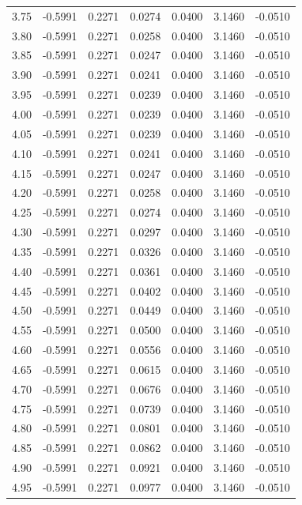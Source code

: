 \begin{longtable}{|c|c|c|c|c|c|c|}
3.75 & -0.5991 & 0.2271 & 0.0274 & 0.0400 & 3.1460 & -0.0510 \\
3.80 & -0.5991 & 0.2271 & 0.0258 & 0.0400 & 3.1460 & -0.0510 \\
3.85 & -0.5991 & 0.2271 & 0.0247 & 0.0400 & 3.1460 & -0.0510 \\
3.90 & -0.5991 & 0.2271 & 0.0241 & 0.0400 & 3.1460 & -0.0510 \\
3.95 & -0.5991 & 0.2271 & 0.0239 & 0.0400 & 3.1460 & -0.0510 \\
4.00 & -0.5991 & 0.2271 & 0.0239 & 0.0400 & 3.1460 & -0.0510 \\
4.05 & -0.5991 & 0.2271 & 0.0239 & 0.0400 & 3.1460 & -0.0510 \\
4.10 & -0.5991 & 0.2271 & 0.0241 & 0.0400 & 3.1460 & -0.0510 \\
4.15 & -0.5991 & 0.2271 & 0.0247 & 0.0400 & 3.1460 & -0.0510 \\
4.20 & -0.5991 & 0.2271 & 0.0258 & 0.0400 & 3.1460 & -0.0510 \\
4.25 & -0.5991 & 0.2271 & 0.0274 & 0.0400 & 3.1460 & -0.0510 \\
4.30 & -0.5991 & 0.2271 & 0.0297 & 0.0400 & 3.1460 & -0.0510 \\
4.35 & -0.5991 & 0.2271 & 0.0326 & 0.0400 & 3.1460 & -0.0510 \\
4.40 & -0.5991 & 0.2271 & 0.0361 & 0.0400 & 3.1460 & -0.0510 \\
4.45 & -0.5991 & 0.2271 & 0.0402 & 0.0400 & 3.1460 & -0.0510 \\
4.50 & -0.5991 & 0.2271 & 0.0449 & 0.0400 & 3.1460 & -0.0510 \\
4.55 & -0.5991 & 0.2271 & 0.0500 & 0.0400 & 3.1460 & -0.0510 \\
4.60 & -0.5991 & 0.2271 & 0.0556 & 0.0400 & 3.1460 & -0.0510 \\
4.65 & -0.5991 & 0.2271 & 0.0615 & 0.0400 & 3.1460 & -0.0510 \\
4.70 & -0.5991 & 0.2271 & 0.0676 & 0.0400 & 3.1460 & -0.0510 \\
4.75 & -0.5991 & 0.2271 & 0.0739 & 0.0400 & 3.1460 & -0.0510 \\
4.80 & -0.5991 & 0.2271 & 0.0801 & 0.0400 & 3.1460 & -0.0510 \\
4.85 & -0.5991 & 0.2271 & 0.0862 & 0.0400 & 3.1460 & -0.0510 \\
4.90 & -0.5991 & 0.2271 & 0.0921 & 0.0400 & 3.1460 & -0.0510 \\
4.95 & -0.5991 & 0.2271 & 0.0977 & 0.0400 & 3.1460 & -0.0510 \\

\end{longtable}
